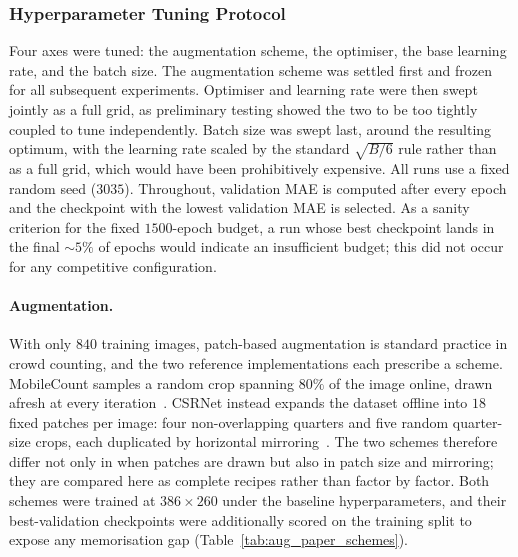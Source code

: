 \documentclass[conference]{IEEEtran}
\begin{document}
\subsubsection{Hyperparameter Tuning Protocol}
Four axes were tuned: the augmentation scheme, the optimiser, the base learning rate, and the batch size. The augmentation scheme was settled first and frozen for all subsequent experiments. Optimiser and learning rate were then swept jointly as a full grid, as preliminary
testing showed the two to be too tightly coupled to tune
independently. Batch size was swept last, around the resulting optimum, with the learning rate scaled by the standard $\sqrt{B/6}$
rule rather than as a full grid, which would have been prohibitively
expensive. All runs use a fixed random seed ($3035$). Throughout,
validation MAE is computed after every epoch and the checkpoint with
the lowest validation MAE is selected. As a sanity criterion for the
fixed $1500$-epoch budget, a run whose best checkpoint lands in the
final ${\sim}5\%$ of epochs would indicate an insufficient budget;
this did not occur for any competitive configuration.

\paragraph{Augmentation.}
With only $840$ training images, patch-based augmentation is standard
practice in crowd counting, and the two reference implementations each
prescribe a scheme. MobileCount samples a random crop spanning $80\%$
of the image online, drawn afresh at every iteration~\cite{wang2020mobilecount}. CSRNet instead expands the dataset offline into $18$ fixed patches per image: four non-overlapping quarters and five random quarter-size crops, each duplicated by horizontal mirroring~\cite{li2018csrnet}. The two schemes therefore differ not only in when patches are drawn but also in patch size and mirroring; they are compared here as complete recipes rather than factor by factor. Both schemes were trained at $386\times260$ under the baseline hyperparameters, and their best-validation checkpoints were additionally scored on the training split to expose any memorisation gap (Table~\ref{tab:aug_paper_schemes}).
\end{document}
